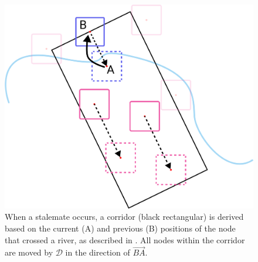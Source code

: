 {
\begin{figure}[tb!]
    \centering
    \includegraphics[width=\columnwidth]{figure/corridor.png}
    \caption{When a stalemate occurs, a corridor (black rectangular) is derived based on the current (A) and previous (B) positions of the node that crossed a river, as described in . All nodes within the corridor are moved by $ \mathcal{D} $ in the direction of $ \vec{BA} $. }
    \label{fig:corridor}
\end{figure}
}


